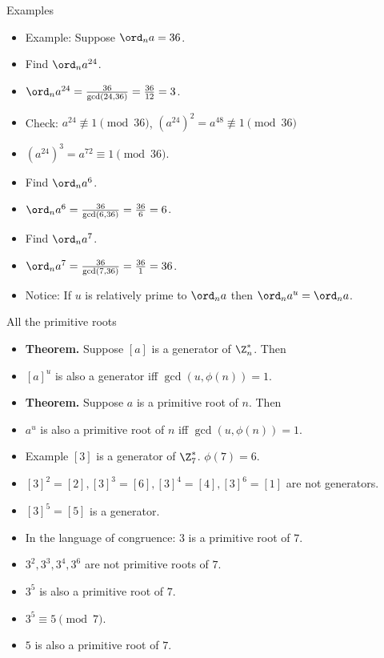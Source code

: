 \documentclass{beamer}
\begin{document}
\begin{frame}{Examples}

\begin{itemize}
  \item Example: Suppose $\ord_n a = 36$.
  \item Find $\ord_n a^{24}$.
  \item $\ord_n a^{24} = \frac{36}{\gcd(24,36)} = \frac{36}{12} = 3$.
  \item Check: $a^{24} \not\equiv 1 \pmod{36}$, $(a^{24})^2=a^{48} \not\equiv 1 \pmod{36}$
  \item $(a^{24})^3=a^{72} \equiv 1 \pmod{36}$.
  \item Find $\ord_n a^{6}$.
  \item $\ord_n a^{6} = \frac{36}{\gcd(6,36)} = \frac{36}{6} = 6$.
  \item Find $\ord_n a^{7}$.
  \item $\ord_n a^{7} = \frac{36}{\gcd(7,36)} = \frac{36}{1} = 36$.
  \item Notice: If $u$ is relatively prime to $\ord_n a$ then $\ord_n a^u = \ord_n a$.
\end{itemize}

\end{frame}

\begin{frame}{All the primitive roots}

\begin{itemize}
  \item \textbf{Theorem.} Suppose $[a]$ is a generator of $\Z_n^*$. Then
  \item $[a]^u$ is also a generator iff $\gcd(u,\phi(n)) = 1$.
  \item \textbf{Theorem.} Suppose $a$ is a primitive root of $n$. Then
  \item $a^u$ is also a primitive root of $n$ iff $\gcd(u,\phi(n))=1$.
  \item Example $[3]$ is a generator of $\Z_7^*$. $\phi(7) = 6$.
  \item $[3]^2 = [2], [3]^3 = [6], [3]^4=[4], [3]^6=[1]$ are not generators.
  \item $[3]^5=[5]$ is a generator.
  \item In the language of congruence: $3$ is a primitive root of $7$.
  \item $3^2, 3^3, 3^4, 3^6$ are not primitive roots of $7$.
  \item $3^5$ is also a primitive root of $7$.
  \item $3^5 \equiv 5 \pmod 7$.
  \item $5$ is also a primitive root of $7$.
\end{itemize}

\end{frame}
\end{document}
